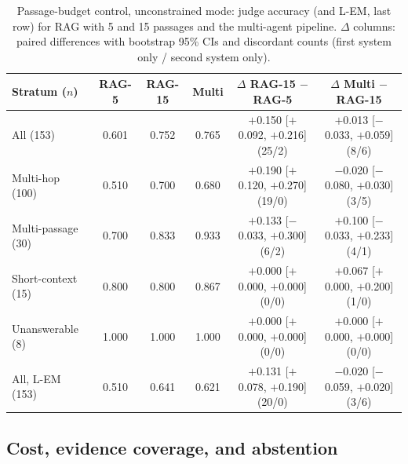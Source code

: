 \documentclass[11pt,a4paper]{article}
\newcommand{\lem}{L-EM}
\begin{document}
\begin{table}[t]
\centering
\footnotesize
\setlength{\tabcolsep}{3.5pt}
\caption{Passage-budget control, unconstrained mode: judge accuracy (and
\lem{}, last row) for RAG with 5 and 15 passages and the multi-agent
pipeline. $\Delta$ columns: paired differences with bootstrap 95\% CIs and
discordant counts (first system only / second system only).}
\label{tab:control}
\begin{tabular}{lccccc}
\toprule
Stratum ($n$) & RAG-5 & RAG-15 & Multi &
  $\Delta$ RAG-15 $-$ RAG-5 & $\Delta$ Multi $-$ RAG-15 \\
\midrule
All (153) & 0.601 & 0.752 & 0.765 & $+$0.150 {\scriptsize[$+$0.092, $+$0.216]} (25/2) & $+$0.013 {\scriptsize[$-$0.033, $+$0.059]} (8/6) \\
Multi-hop (100) & 0.510 & 0.700 & 0.680 & $+$0.190 {\scriptsize[$+$0.120, $+$0.270]} (19/0) & $-$0.020 {\scriptsize[$-$0.080, $+$0.030]} (3/5) \\
Multi-passage (30) & 0.700 & 0.833 & 0.933 & $+$0.133 {\scriptsize[$-$0.033, $+$0.300]} (6/2) & $+$0.100 {\scriptsize[$-$0.033, $+$0.233]} (4/1) \\
Short-context (15) & 0.800 & 0.800 & 0.867 & $+$0.000 {\scriptsize[$+$0.000, $+$0.000]} (0/0) & $+$0.067 {\scriptsize[$+$0.000, $+$0.200]} (1/0) \\
Unanswerable (8) & 1.000 & 1.000 & 1.000 & $+$0.000 {\scriptsize[$+$0.000, $+$0.000]} (0/0) & $+$0.000 {\scriptsize[$+$0.000, $+$0.000]} (0/0) \\
\midrule
All, \lem{} (153) & 0.510 & 0.641 & 0.621 & $+$0.131 {\scriptsize[$+$0.078, $+$0.190]} (20/0) & $-$0.020 {\scriptsize[$-$0.059, $+$0.020]} (3/6) \\
\bottomrule
\end{tabular}
\end{table}

\subsection{Cost, evidence coverage, and abstention}
\end{document}
